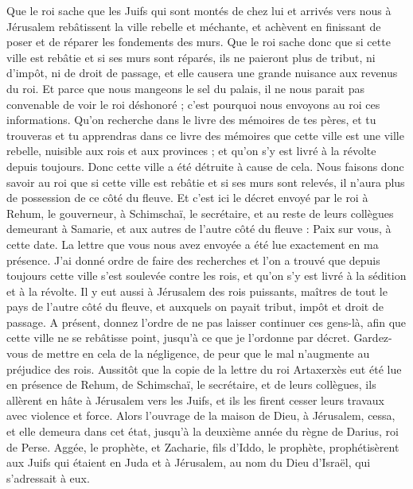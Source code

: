 \begin{multicols}{2}
Que le roi sache que les Juifs qui sont montés de chez lui et arrivés vers nous à Jérusalem rebâtissent la ville rebelle et méchante, et achèvent en finissant de poser et de réparer les fondements des murs.
Que le roi sache donc que si cette ville est rebâtie et si ses murs sont réparés, ils ne paieront plus de tribut, ni d’impôt, ni de droit de passage, et elle causera une grande nuisance aux revenus du roi.
Et parce que nous mangeons le sel du palais, il ne nous parait pas convenable de voir le roi déshonoré ; c'est pourquoi nous envoyons au roi ces informations.
Qu'on recherche dans le livre des mémoires de tes pères, et tu trouveras et tu apprendras dans ce livre des mémoires que cette ville est une ville rebelle, nuisible aux rois et aux provinces ; et qu’on s’y est livré à la révolte depuis toujours. Donc cette ville a été détruite à cause de cela.
Nous faisons donc savoir au roi que si cette ville est rebâtie et si ses murs sont relevés, il n'aura plus de possession de ce côté du fleuve.
Et c'est ici le décret envoyé par le roi à Rehum, le gouverneur, à Schimschaï, le secrétaire, et au reste de leurs collègues demeurant à Samarie, et aux autres de l'autre côté du fleuve : Paix sur vous, à cette date.
La lettre que vous nous avez envoyée a été lue exactement en ma présence.
J'ai donné ordre de faire des recherches et l’on a trouvé  que depuis toujours cette ville s'est soulevée contre les rois, et qu'on s’y est livré à la sédition et à la révolte.
Il y eut aussi à Jérusalem des rois puissants, maîtres de tout le pays de l'autre côté du fleuve, et auxquels on payait  tribut, impôt et droit de passage.
A présent, donnez l’ordre de ne pas laisser continuer ces gens-là, afin que cette ville ne se rebâtisse point, jusqu’à ce que je l'ordonne par décret.
Gardez-vous de mettre en cela de la négligence, de peur que le mal  n’augmente au préjudice des rois.
Aussitôt que la copie de la lettre du roi Artaxerxès eut été lue en présence de Rehum, de Schimschaï,  le secrétaire, et de leurs collègues, ils allèrent en hâte à Jérusalem vers les Juifs, et ils les firent cesser leurs travaux avec violence et force.
Alors l’ouvrage de la maison de Dieu, à Jérusalem, cessa, et elle demeura dans cet état, jusqu'à la deuxième année du règne de Darius, roi de Perse.
\VerseOne{}Aggée, le prophète, et Zacharie, fils d'Iddo, le prophète, prophétisèrent aux Juifs qui étaient en Juda et à Jérusalem, au nom du Dieu d'Israël, qui s’adressait à eux.

\end{multicols}
